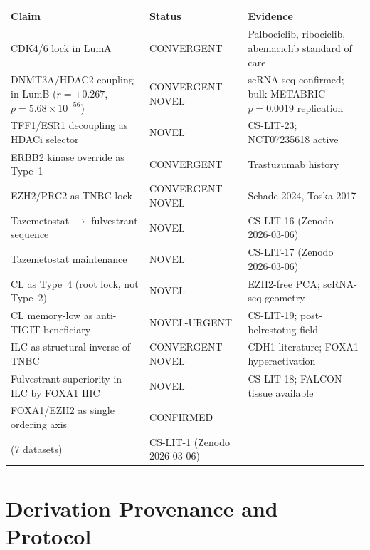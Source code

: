 \documentclass[12pt, a4paper]{article}
\begin{document}
\begin{center}
\begin{tabular}{p{4cm}p{2.8cm}p{6cm}}
\toprule
\textbf{Claim} & \textbf{Status} & \textbf{Evidence} \\
\midrule

CDK4/6 lock in LumA
& CONVERGENT
& Palbociclib, ribociclib, abemaciclib standard of care \\[0.8em]

DNMT3A/HDAC2 coupling in LumB
($r=+0.267$, $p=5.68\times10^{-56}$)
& CONVERGENT-NOVEL
& scRNA-seq confirmed; bulk METABRIC $p=0.0019$ replication \\[0.8em]

TFF1/ESR1 decoupling as HDACi selector
& NOVEL
& CS-LIT-23; NCT07235618 active \\[0.8em]

ERBB2 kinase override as Type~1
& CONVERGENT
& Trastuzumab history \\[0.8em]

EZH2/PRC2 as TNBC lock
& CONVERGENT-NOVEL
& Schade 2024, Toska 2017 \\[0.8em]

Tazemetostat $\rightarrow$ fulvestrant sequence
& NOVEL
& CS-LIT-16 (Zenodo 2026-03-06) \\[0.8em]

Tazemetostat maintenance
& NOVEL
& CS-LIT-17 (Zenodo 2026-03-06) \\[0.8em]

CL as Type~4 (root lock, not Type~2)
& NOVEL
& EZH2-free PCA; scRNA-seq geometry \\[0.8em]

CL memory-low as anti-TIGIT beneficiary
& NOVEL-URGENT
& CS-LIT-19; post-belrestotug field \\[0.8em]

ILC as structural inverse of TNBC
& CONVERGENT-NOVEL
& CDH1 literature; FOXA1 hyperactivation \\[0.8em]

Fulvestrant superiority in ILC by FOXA1 IHC
& NOVEL
& CS-LIT-18; FALCON tissue available \\[0.8em]

FOXA1/EZH2 as single ordering axis
& CONFIRMED\\(7 datasets)
& CS-LIT-1 (Zenodo 2026-03-06) \\[0.4em]

\bottomrule
\end{tabular}
\end{center}
\section{Derivation Provenance and Protocol}
\end{document}
